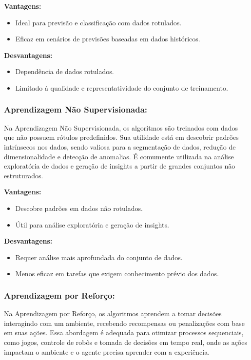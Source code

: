 \documentclass[12pt,a4paper,twoside]{report}
\begin{document}
{\textbf{Vantagens:}
\begin{itemize}
    \item Ideal para previsão e classificação com dados rotulados.
    \item Eficaz em cenários de previsões baseadas em dados históricos.
\end{itemize}

\textbf{Desvantagens:}
\begin{itemize}
    \item Dependência de dados rotulados.
    \item Limitado à qualidade e representatividade do conjunto de treinamento.
\end{itemize}

\subsubsection*{Aprendizagem Não Supervisionada:}
Na Aprendizagem Não Supervisionada, os algoritmos são treinados com dados que não possuem rótulos predefinidos. Sua utilidade está em descobrir padrões intrínsecos nos dados, sendo valiosa para a segmentação de dados, redução de dimensionalidade e detecção de anomalias. É comumente utilizada na análise exploratória de dados e geração de insights a partir de grandes conjuntos não estruturados.

\textbf{Vantagens:}
\begin{itemize}
    \item Descobre padrões em dados não rotulados.
    \item Útil para análise exploratória e geração de insights.
\end{itemize}

\textbf{Desvantagens:}
\begin{itemize}
    \item Requer análise mais aprofundada do conjunto de dados.
    \item Menos eficaz em tarefas que exigem conhecimento prévio dos dados.
\end{itemize}

\subsubsection*{Aprendizagem por Reforço:}
Na Aprendizagem por Reforço, os algoritmos aprendem a tomar decisões interagindo com um ambiente, recebendo recompensas ou penalizações com base em suas ações. Essa abordagem é adequada para otimizar processos sequenciais, como jogos, controle de robôs e tomada de decisões em tempo real, onde as ações impactam o ambiente e o agente precisa aprender com a experiência.

}
\end{document}
